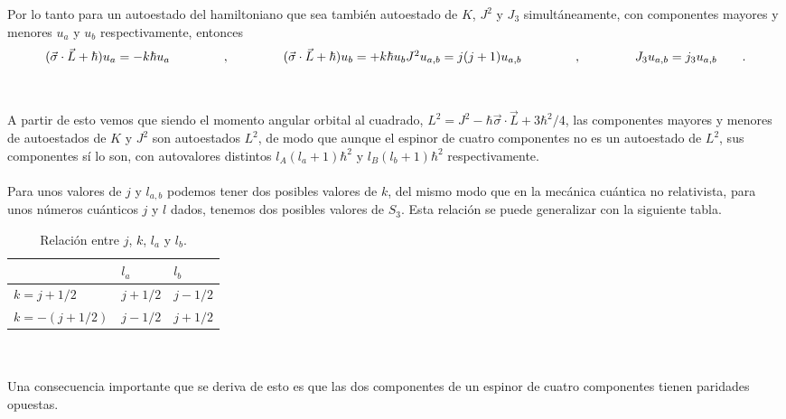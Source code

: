 \documentclass[11pt,letterpaper]{article}     %
\begin{document}
Por lo tanto para un autoestado del hamiltoniano que sea también autoestado de $K$, $J^2$ y $J_3$ simultáneamente, con componentes mayores y menores $u_a$ y $u_b$ respectivamente, entonces
\begin{equation} \label{eq:88}
(\vec{\sigma} \cdot \vec{L} + \hbar) u_a = -k \hbar u_a \hspace{1.5cm} , \hspace{1.5cm} (\vec{\sigma} \cdot \vec{L} + \hbar) u_b = +k \hbar u_b $$\\$$ J^2 u_{a,b}=j(j+1) u_{a,b} \hspace{1.5cm} , \hspace{1.5cm} J_3 u_{a,b}=j_3 u_{a,b} \qquad .
\end{equation} \\ \\
A partir de esto vemos que siendo el momento angular orbital al cuadrado, $L^2=J^2-\hbar \vec{\sigma} \cdot \vec{L} + 3\hbar^2/4$, las componentes mayores y menores de autoestados de $K$ y $J^2$ son autoestados $L^2$, de modo que aunque el espinor de cuatro componentes no es un autoestado de $L^2$, sus componentes sí lo son, con autovalores  distintos $l_A(l_a+1)\hbar^2$ y $l_B(l_b+1)\hbar^2$ respectivamente. \\ \\
Para unos valores de $j$ y $l_{a,b}$ podemos tener dos posibles valores de $k$, del mismo modo que en la mecánica cuántica no relativista, para unos números cuánticos $j$ y $l$ dados, tenemos dos posibles valores de $S_3$. Esta relación se puede generalizar con la siguiente tabla. \\
\begin{table}[htbp] \label{table:2}
\begin{center} 
\begin{tabular}{|l|l|l|}
\hline 
{}& $l_a$ & $l_b$  \\
\hline 
$k=j+1/2$ & $j+1/2$ & $j-1/2$\\ \hline
$k=-(j+1/2)$ & $j-1/2$ & $j+1/2$\\ \hline
\end{tabular}
\caption{Relación entre $j$, $k$, $l_a$ y $l_b$.} 
\end{center} 
\end{table} \\ \\
Una consecuencia importante que se deriva de esto es que las dos componentes de un espinor de cuatro componentes tienen paridades opuestas. \\ \\
\end{document}
